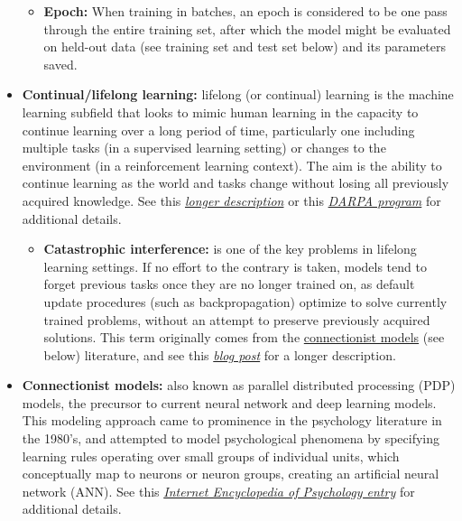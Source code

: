 \begin{itemize}
  \begin{itemize}
  \item \textbf{Epoch:\label{tg:epoch}} When training in batches, an epoch is considered to be one pass through the entire training set, after which the model might be evaluated on held-out data (see training set and test set below) and its parameters saved.
  \end{itemize}
  
\item \textbf{Continual/lifelong learning:\label{tg:lifelong-learning}} lifelong (or continual) learning is the machine learning subfield that looks to mimic human learning in the capacity to continue learning over a long period of time, particularly one including multiple tasks (in a supervised learning setting) or changes to the environment (in a reinforcement learning context). The aim is the ability to continue learning as the world and tasks change without losing all previously acquired knowledge. See this \href{https://www.cs.uic.edu/~liub/lifelong-learning.html}{\emph{longer description}} or this \href{https://www.darpa.mil/news-events/2017-03-16}{\emph{DARPA program}} for additional details.
  \begin{itemize}
  \item \textbf{Catastrophic interference:\label{tg:catastrophic}} is one of the key problems in lifelong learning settings. If no effort to the contrary is taken, models tend to forget previous tasks once they are no longer trained on, as default update procedures (such as backpropagation) optimize to solve currently trained problems, without an attempt to preserve previously acquired solutions. This term originally comes from the \hyperref[tg:connectionist]{connectionist models} (see below) literature, and see this \href{https://rylanschaeffer.github.io/content/research/overcoming_catastrophic_forgetting/main.html}{\emph{blog post}} for a longer description.
  \end{itemize}
  
\item \textbf{Connectionist models:\label{tg:connectionist}} also known as parallel distributed processing (PDP) models, the precursor to current neural network and deep learning models. This modeling approach came to prominence in the psychology literature in the 1980's, and attempted to model psychological phenomena by specifying learning rules operating over small groups of individual units, which conceptually map to neurons or neuron groups, creating an artificial neural network (ANN). See this \href{https://www.iep.utm.edu/connect/}{\emph{Internet Encyclopedia of Psychology entry}} for additional details.


\end{itemize}
